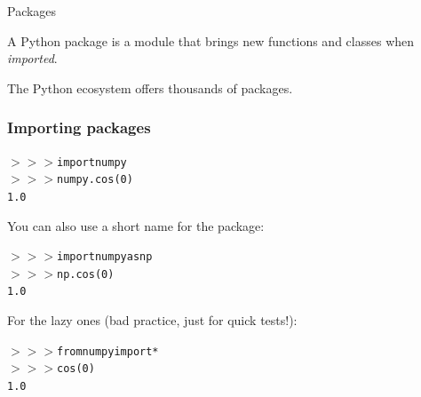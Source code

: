 \documentclass[xcolor=pdftex,dvipsnames,table,mathserif]{beamer}
\begin{document}
\begin{frame}{Packages}

  A Python package is a module that brings new functions and classes when \emph{imported}.

  The Python ecosystem offers thousands of packages.

\end{frame}


\begin{frame}
  \frametitle{Importing packages}
  \begin{block}{}
    \begin{alltt}
      $>>>$ import numpy\\
      $>>>$ numpy.cos(0)\\
      1.0
    \end{alltt}
  \end{block}

  You can also use a short name for the package:

  \begin{block}{}
    \begin{alltt}
      $>>>$ import numpy as \alert{np}\\
      $>>>$ \alert{np}.cos(0)\\
      1.0
    \end{alltt}
  \end{block}

  For the lazy ones (bad practice, just for quick tests!):

  \begin{block}{}
    \begin{alltt}
      $>>>$ from numpy import *\\
      $>>>$ cos(0)\\
      1.0
    \end{alltt}
  \end{block}

\end{frame}

\end{document}
